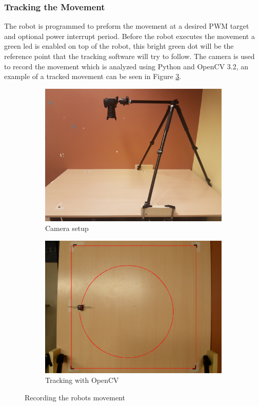 \subsubsection{Tracking the Movement}

The robot is programmed to preform the movement at a desired PWM target and optional power interrupt period.
Before the robot executes the movement a green led is enabled on top of the robot, this bright green dot will be the reference point that the tracking software will try to follow.
The camera is used to record the movement which is analyzed using Python and OpenCV 3.2, an example of a tracked movement can be seen in Figure \ref{fig:movement_example}.

\begin{figure}
	\centering
	\begin{subfigure}[b]{0.45\textwidth}
		\includegraphics[width=\textwidth]{pics/movement_setup.jpg}
		\caption{Camera setup}
		\label{fig:movement_setup}
	\end{subfigure}
	\quad
	\begin{subfigure}[b]{0.45\textwidth}
		\includegraphics[width=\textwidth]{pics/movement_example.png}
		\caption{Tracking with OpenCV}
		\label{fig:movement_example}
	\end{subfigure}
	\caption{Recording the robots movement}
\end{figure}


